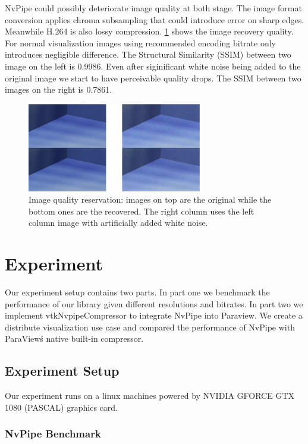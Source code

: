 \documentclass{vgtc}                          %
\begin{document}
NvPipe could possibly deteriorate image quality at both stage. The image format conversion applies chroma subsampling that could introduce error on sharp edges. Meanwhile H.264 is also lossy compression. \ref{figure:quality} shows the image recovery quality. For normal visualization images using recommended encoding bitrate only introduces negligible difference. The Structural Similarity (SSIM) between two image on the left is 0.9986. Even after siginificant white noise being added to the original image we start to have perceivable quality drops. The SSIM between two images on the right is 0.7861.

\begin{figure}[htb]
  \label{figure:quality}
  \centering
  \includegraphics[width=3in]{quality.eps}
  \caption{Image quality reservation: images on top are the original while the bottom ones are the recovered. The right column uses the left column image with artificially added white noise.}
\end{figure}


\section{Experiment}

Our experiment setup contains two parts. In part one we benchmark the performance of our library given different resolutions and bitrates. In part two we implement vtkNvpipeCompressor to integrate NvPipe into Paraview. We create a distribute visualization use case and compared the performance of NvPipe with ParaView\'s native built-in compressor.

\subsection{Experiment Setup}
Our experiment runs on a linux machines powered by NVIDIA GFORCE GTX 1080 (PASCAL) graphics card.

\subsubsection{NvPipe Benchmark}
\end{document}
